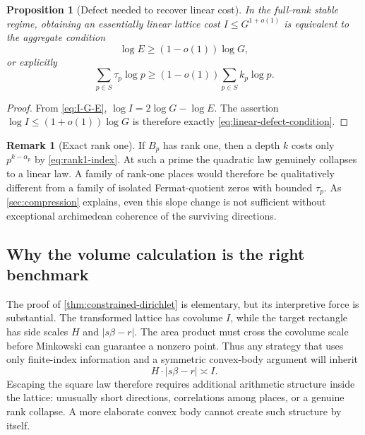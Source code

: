 \documentclass[11pt,oneside]{article}
\newtheorem{proposition}[theorem]{Proposition}
\theoremstyle{definition}
\newtheorem{remark}[theorem]{Remark}
\begin{document}
\begin{proposition}[Defect needed to recover linear cost]
\label{prop:linear-cost}
In the full-rank stable regime, obtaining an essentially linear lattice
cost $I\le G^{1+o(1)}$ is equivalent to the aggregate condition
\begin{equation}\label{eq:linear-defect-condition}
  \log E\ge(1-o(1))\log G,
\end{equation}
or explicitly
\begin{equation}\label{eq:tau-budget-condition}
  \sum_{p\in S}\tau_p\log p
  \ge(1-o(1))\sum_{p\in S}k_p\log p.
\end{equation}
\end{proposition}

\begin{proof}
From \eqref{eq:I-G-E},
$\log I=2\log G-\log E$.  The assertion
$\log I\le(1+o(1))\log G$ is therefore exactly
\eqref{eq:linear-defect-condition}.
\end{proof}

\begin{remark}[Exact rank one]
If $B_p$ has rank one, then a depth $k$ costs only
$p^{k-\alpha_p}$ by \eqref{eq:rank1-index}.  At such a prime the quadratic
law genuinely collapses to a linear law.  A family of rank-one places would therefore be qualitatively different from a
family of isolated Fermat-quotient zeros with bounded $\tau_p$.  As
\cref{sec:compression} explains, even this slope change is not sufficient
without exceptional archimedean coherence of the surviving directions.
\end{remark}

\subsection{Why the volume calculation is the right benchmark}

The proof of \cref{thm:constrained-dirichlet} is elementary, but its
interpretive force is substantial.  The transformed lattice has
covolume $I$, while the target rectangle has side scales $H$ and
$|s\beta-r|$.  The area product must cross the covolume scale before
Minkowski can guarantee a nonzero point.  Thus any strategy that uses only
finite-index information and a symmetric convex-body argument will inherit
\begin{equation}\label{eq:area-conservation}
  H\cdot|s\beta-r|\asymp I.
\end{equation}
Escaping the square law therefore requires additional arithmetic structure
inside the lattice: unusually short directions, correlations among places,
or a genuine rank collapse.  A more elaborate convex body cannot create
such structure by itself.
\end{document}
